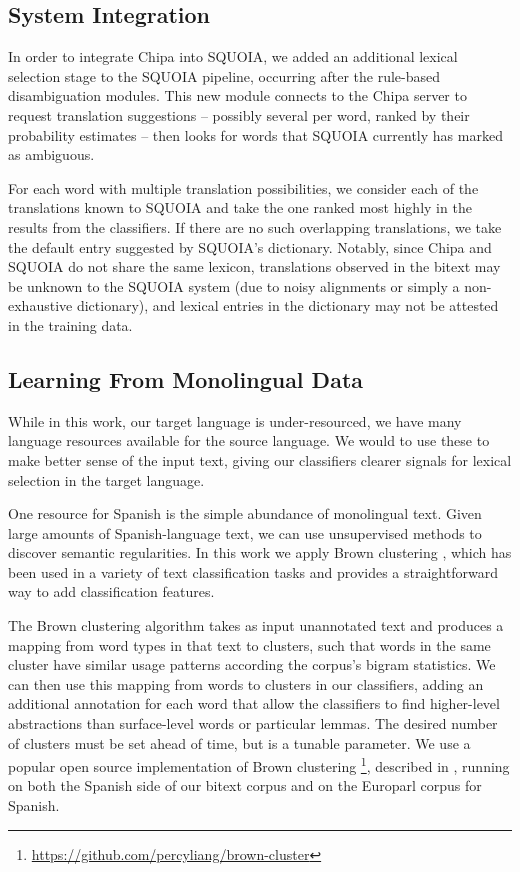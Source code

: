 \documentclass[10pt, a4paper]{article}
\begin{document}
\subsection{System Integration}
In order to integrate Chipa into SQUOIA, we added an additional lexical
selection stage to the SQUOIA pipeline, occurring after the rule-based
disambiguation modules. This new module connects to the Chipa server to request
translation suggestions -- possibly several per word, ranked by their
probability estimates -- then looks for words that SQUOIA currently has marked
as ambiguous.

For each word with multiple translation possibilities, we consider each of the
translations known to SQUOIA and take the one ranked most highly in the
results from the classifiers. If there are no such overlapping translations, we
take the default entry suggested by SQUOIA's dictionary.
Notably, since Chipa and SQUOIA do not share the same lexicon, translations
observed in the bitext may be unknown to the SQUOIA system (due to noisy
alignments or simply a non-exhaustive dictionary), and lexical entries in the
dictionary may not be attested in the training data.

\subsection{Learning From Monolingual Data}
While in this work, our target language is under-resourced, we have many
language resources available for the source language. We would to use these to
make better sense of the input text, giving our classifiers clearer signals for
lexical selection in the target language.

One resource for Spanish is the simple abundance of monolingual text. Given
large amounts of Spanish-language text, we can use unsupervised methods to
discover semantic regularities. In this work we apply Brown clustering
\cite{Brown92class-basedn-gram}, which has been used in a variety of text
classification tasks \cite{turian-ratinov-bengio:2010:ACL} and provides a
straightforward way to add classification features.

The Brown clustering algorithm takes as input unannotated text and produces a
mapping from word types in that text to clusters, such that words in the same
cluster have similar usage patterns according the corpus's bigram statistics.
We can then use this mapping from words to clusters in our classifiers, adding
an additional annotation for each word that allow the classifiers to find
higher-level abstractions than surface-level words or particular lemmas.
The desired number of clusters must be set ahead of time, but is a tunable
parameter.
We use a popular open source implementation of Brown clustering
\footnote{\url{https://github.com/percyliang/brown-cluster}}, described in
\cite{Liang05semi-supervisedlearning}, running on both the Spanish side of our
bitext corpus and on the Europarl corpus \cite{europarl} for Spanish.
\end{document}
